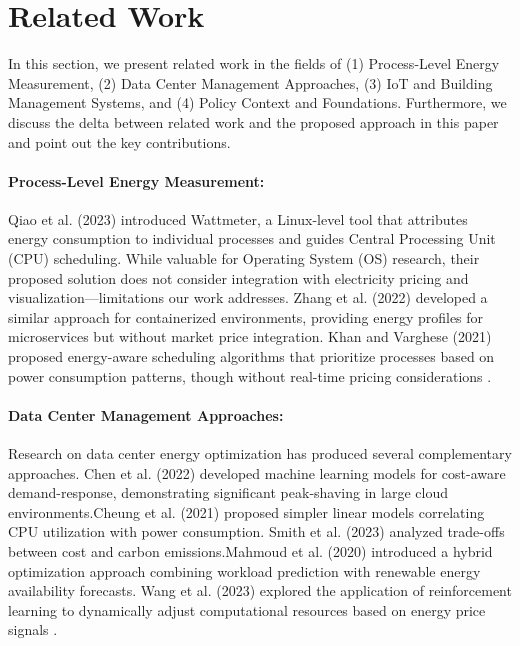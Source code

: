 

\section{Related Work}
\label{related_work:related-work}
In this section, we present related work in the fields of (1) Process-Level Energy Measurement, (2) Data Center Management Approaches, (3) IoT and Building Management Systems, and (4) Policy Context and Foundations.
Furthermore, we discuss the delta between related work and the proposed approach in this paper and point out the key contributions.

\paragraph{\textbf{Process-Level Energy Measurement:}}
Qiao et al. (2023) introduced Wattmeter, a Linux-level tool that attributes energy consumption to
individual processes and guides Central Processing Unit (CPU) scheduling. While valuable for Operating System (OS) research, their proposed solution does not consider
integration with electricity pricing and visualization—limitations our work addresses.
Zhang et al. (2022) developed a similar approach for containerized environments, providing energy
profiles for microservices but without market price integration. Khan and Varghese (2021) proposed
energy-aware scheduling algorithms that prioritize processes based on power consumption patterns,
though without real-time pricing considerations \cite{qiao2023wattmeter,zhang2022container,khan2021energy}.

\newpage
\paragraph{\textbf{Data Center Management Approaches:}}
Research on data center energy optimization has produced several complementary approaches.
Chen et al. (2022) developed machine learning models for cost-aware demand-response, demonstrating
significant peak-shaving in large cloud environments.Cheung et al. (2021) proposed simpler linear
models correlating CPU utilization with power consumption. Smith et al. (2023) analyzed trade-offs
between cost and carbon emissions.Mahmoud et al. (2020) introduced a hybrid optimization approach
combining workload prediction with renewable energy availability forecasts. Wang et al. (2023) explored the application of reinforcement learning to dynamically adjust
computational resources based on energy price signals \cite{chen2022datacentermodel,cheung2021utilizationmodel,smith2023warofefficiencies,mahmoud2020cost,wang2023reinforcement}.


